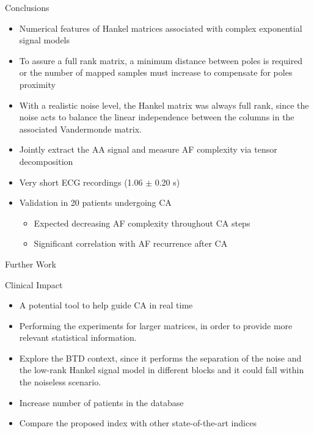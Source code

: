 \documentclass{beamer}
\begin{document}
	\begin{frame}{Conclusions} 
		
			\begin{itemize}
				\item Numerical features of Hankel matrices associated with complex exponential signal models
				\item To assure a full rank matrix, a minimum distance between poles is required or the number of mapped samples must increase to compensate for poles proximity
				\item With a realistic noise level, the Hankel matrix was always full rank, since the noise acts to balance the linear independence between the columns in the associated Vandermonde matrix.
				\item Jointly extract the AA signal and measure AF complexity via tensor decomposition
				\item Very short ECG recordings (1.06 $\pm$ 0.20 s)
				\item Validation in 20 patients undergoing CA
				\begin{itemize}
					\item Expected decreasing AF complexity throughout CA steps
					\item Significant correlation with AF recurrence after CA
				\end{itemize}
			\end{itemize}
		
		
	\end{frame}


	\begin{frame}{Further Work} 

	\begin{block}{Clinical Impact}
			\begin{itemize}
				\item A potential tool to help guide CA in real time
			\end{itemize}
	\end{block}

	\vspace{1cm}
		\begin{itemize}
			\item Performing the experiments for larger matrices, in order to provide more relevant statistical information.
			\item Explore the BTD context, since it performs the separation of the noise and the low-rank Hankel signal model in different blocks and it could fall within the noiseless scenario.
			\item Increase number of patients in the database
			\item Compare the proposed index with other state-of-the-art indices
		\end{itemize}
	
	\end{frame}
\end{document}
